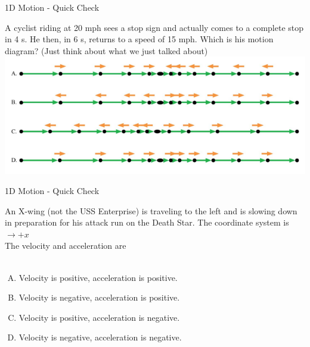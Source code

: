 \documentclass{beamer}
\newcommand{\red}[1]{{\color{red}{#1}}}
\newcommand{\checkh}[2]{\begin{textblock*}{1cm}(#1,#2){\huge \red{\Checkmark}}\end{textblock*}}
\begin{document}
\begin{frame}{1D Motion - Quick Check}
\begin{center}
   A cyclist riding at 20 mph sees a stop sign and actually comes to a complete stop in 4 s. He then, in 6 s, returns to a speed of 15 mph. Which is his motion diagram? (Just think about what we just talked about)
   \includegraphics[width=\textwidth]{../figures/QC1_6.png}
   \only<2->{\checkh{0.7cm}{4.8cm}}
\end{center}
\end{frame}

\begin{frame}{1D Motion - Quick Check}
\begin{center}
   An X-wing (not the USS Enterprise) is traveling to the left and is slowing down in preparation for his attack run on the Death Star. The coordinate system is\\ $\rightarrow +x$\\ The velocity and acceleration are\\~\\
\begin{enumerate}[A.]
   \item Velocity is positive, acceleration is positive.
   \item Velocity is negative, acceleration is positive.
   \item Velocity is positive, acceleration is negative.
   \item Velocity is negative, acceleration is negative.
\end{enumerate}
   \only<2->{\checkh{0.5cm}{5.3cm}}
\end{center}
\end{frame}
\end{document}
